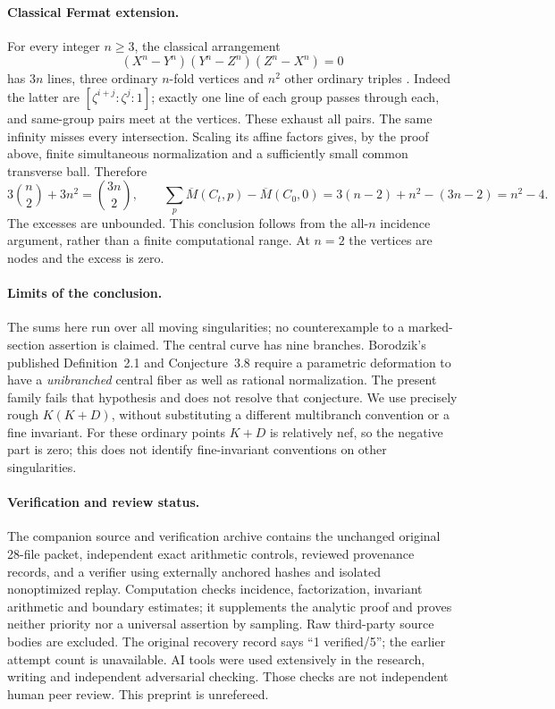 \documentclass[11pt]{article}
\newcommand{\rough}{\overline M}
\begin{document}
\paragraph{Classical Fermat extension.}
For every integer \(n\ge3\), the classical arrangement
\[
 (X^n-Y^n)(Y^n-Z^n)(Z^n-X^n)=0
\]
has \(3n\) lines, three ordinary
\(n\)-fold vertices and \(n^2\) other ordinary triples
\cite[p.~119]{H}. Indeed the latter are
\([\zeta^{i+j}:\zeta^j:1]\); exactly one line of each group passes
through each, and same-group pairs meet at the vertices. These exhaust
all pairs. The same infinity misses every intersection. Scaling its
affine factors gives, by the proof above, finite simultaneous normalization
and a sufficiently small common transverse ball. Therefore
\[
 3\binom n2+3n^2=\binom{3n}2,\qquad
 \sum_p\rough(C_t,p)-\rough(C_0,0)
   =3(n-2)+n^2-(3n-2)=n^2-4.
\]
The excesses are unbounded. This conclusion follows from the all-\(n\)
incidence argument, rather than a finite computational range. At \(n=2\)
the vertices are nodes and the excess is zero.

\paragraph{Limits of the conclusion.}
The sums here run over all moving singularities; no counterexample to a
marked-section assertion is claimed. The central curve has nine branches.
Borodzik's published Definition~2.1 and Conjecture~3.8
\cite[pp.~575,577]{B} require a parametric deformation to have a
\emph{unibranched} central fiber as well as rational normalization.
The present family fails that hypothesis and does not resolve that
conjecture. We use precisely rough \(K(K+D)\), without substituting a
different multibranch convention or a fine invariant. For these ordinary
points \(K+D\) is relatively nef, so the negative part is zero; this does
not identify fine-invariant conventions on other singularities.

\paragraph{Verification and review status.}
The companion source and verification archive contains the unchanged
original 28-file packet, independent exact arithmetic controls, reviewed
provenance records, and a verifier using externally anchored hashes and
isolated nonoptimized replay. Computation checks incidence, factorization,
invariant arithmetic and boundary estimates; it supplements the analytic
proof and proves neither priority nor a universal assertion by sampling.
Raw third-party source bodies are excluded. The original recovery record
says ``1 verified/5''; the earlier attempt count is unavailable.
AI tools were used extensively in the research, writing and independent
adversarial checking. Those checks are not independent human peer review.
This preprint is unrefereed.
\end{document}
